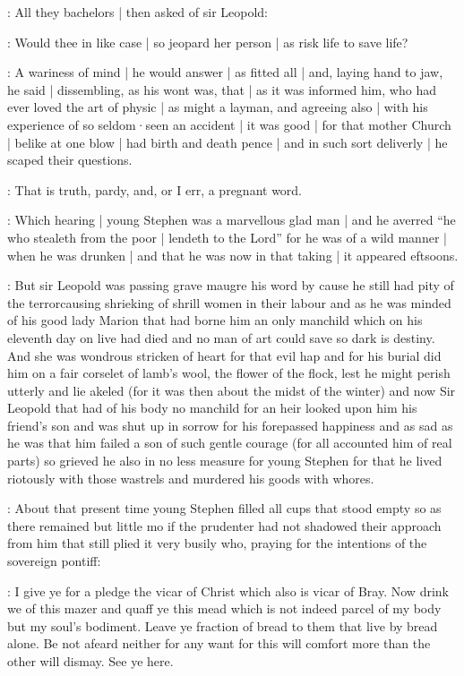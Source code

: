 :
All they bachelors |
then asked of sir Leopold:

\All:
Would thee in like case |
so jeopard her person |
as risk life to save life?

:
A wariness of mind |
he would answer |
as fitted all |
and,
laying hand to jaw,
he said |
dissembling,
as his wont was,
that |
as it was informed him,
who had ever loved the art of physic |
as might a layman,
and agreeing also |
with his experience of so seldom·seen an accident |
it was good |
for that mother Church |
belike at one blow |
had birth and death pence |
and in such sort deliverly |
he scaped their questions.

\dixon:
That is truth,
pardy,
and,
or I err,
a pregnant word.

:
Which hearing |
young Stephen was a marvellous glad man |
and he averred
“he who stealeth from the poor |
lendeth to the Lord”
for he was of a wild manner |
when he was drunken |
and that he was now in that taking |
it appeared eftsoons.


:
But sir Leopold was passing grave maugre his word by cause he still
had pity of the terrorcausing shrieking of shrill women in their labour
and as he was minded of his good lady Marion that had borne him an only
manchild which on his eleventh day on live had died and no man of art
could save so dark is destiny.
And she was wondrous stricken of heart for
that evil hap and for his burial did him on a fair corselet of lamb's
wool,
the flower of the flock,
lest he might perish utterly and lie
akeled
(for it was then about the midst of the winter)
and now Sir Leopold that had of his body no manchild for an heir looked upon him his
friend's son and was shut up in sorrow for his forepassed happiness and
as sad as he was that him failed a son of such gentle courage
(for all accounted him of real parts)
so grieved he also in no less measure for
young Stephen for that he lived riotously with those wastrels and
murdered his goods with whores.



:
About that present time young Stephen filled all cups that stood
empty so as there remained but little mo if the prudenter had not shadowed
their approach from him that still plied it very busily who,
praying for
the intentions of the sovereign pontiff:

\stephen:
I give ye for a pledge the vicar of Christ which also is vicar of
Bray.
Now drink we of this mazer and quaff ye this mead which is not
indeed parcel of my body but my soul's bodiment.
Leave ye fraction of
bread to them that live by bread alone.
Be not afeard neither for any want
for this will comfort more than the other will dismay.
See ye here.

